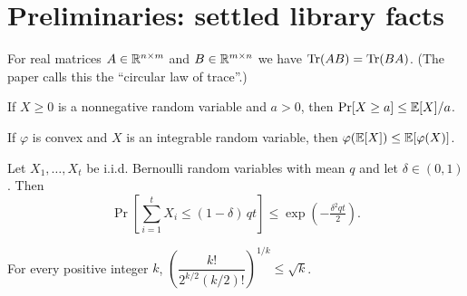 
\chapter{Preliminaries: settled library facts}


\begin{lemma}
  \label{lem:trace-cyclic}
  \mathlibok
  For real matrices $A \in \mathbb{R}^{n \times m}$ and $B \in \mathbb{R}^{m \times n}$ we have
  $\operatorname{Tr}(AB) = \operatorname{Tr}(BA)$. (The paper calls this the ``circular law of trace''.)
\end{lemma}

\begin{lemma}
  \label{lem:markov}
  \mathlibok
  If $X \ge 0$ is a nonnegative random variable and $a > 0$, then
  $\Pr[X \ge a] \le \mathbb{E}[X]/a$.
\end{lemma}

\begin{lemma}
  \label{lem:jensen}
  \mathlibok
  If $\varphi$ is convex and $X$ is an integrable random variable, then
  $\varphi(\mathbb{E}[X]) \le \mathbb{E}[\varphi(X)]$.
\end{lemma}

\begin{lemma}
  \label{lem:chernoff}
  \mathlibok
  Let $X_1, \dots, X_t$ be i.i.d. Bernoulli random variables with mean $q$ and
  let $\delta \in (0,1)$. Then
  \[
    \Pr\!\left[\sum_{i=1}^t X_i \le (1-\delta)\, qt\right]
      \le \exp\!\left(-\tfrac{\delta^2 qt}{2}\right).
  \]
\end{lemma}

\begin{lemma}
  \label{lem:stirling}
  \mathlibok
  For every positive integer $k$, $\left(\dfrac{k!}{2^{k/2}(k/2)!}\right)^{1/k}
  \le \sqrt{k}$.
\end{lemma}


